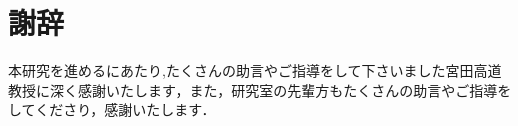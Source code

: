 \documentclass[a4paper,12pt,report]{jsbook}
\begin{document}



\tableofcontents


\newpage
{}
\setcounter{page}{1}









\chapter*{謝辞}
本研究を進めるにあたり,たくさんの助言やご指導をして下さいました宮田高道教授に深く感謝いたします，また，研究室の先輩方もたくさんの助言やご指導をしてくださり，感謝いたします．


\nocite{*}
\cleardoublepage
\pagestyle{plain}





\end{document}
